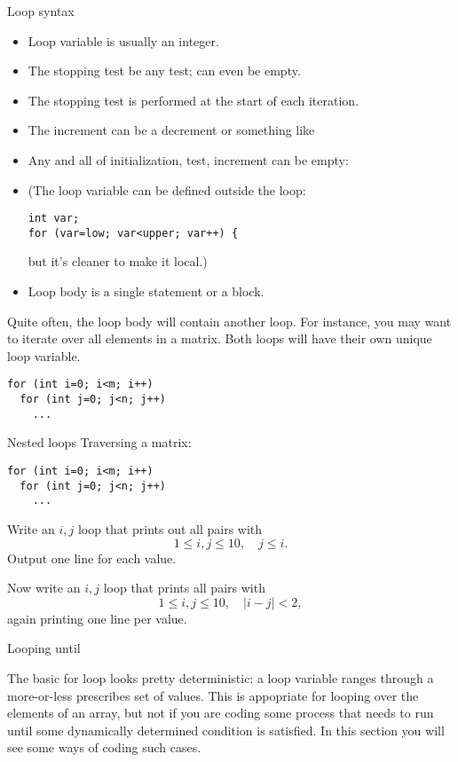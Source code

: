 \begin{slide}{Loop syntax}
  \label{sl:for-syntax}
  \begin{itemize}
  \item Loop variable is usually an integer.
  \item The stopping test be any test; can even be empty.
  \item The stopping test is performed at the start of each iteration.
  \item The increment can be a decrement or something like 
  \item Any and all of initialization, test, increment can be empty:\\
  \item (The loop variable can be defined outside the loop:
\begin{verbatim}
int var;
for (var=low; var<upper; var++) {
\end{verbatim}
but it's cleaner to make it local.)
\item Loop body is a single statement or a block.
  \end{itemize}
\end{slide}

Quite often, the loop body will contain another loop. For instance,
you may want to iterate over all elements in a matrix. Both loops will
have their own unique loop variable.
\begin{verbatim}
for (int i=0; i<m; i++)
  for (int j=0; j<n; j++)
    ...
\end{verbatim}

\begin{slide}{Nested loops}
  \label{sl:for-nest}
  Traversing a matrix:
\begin{verbatim}
for (int i=0; i<m; i++)
  for (int j=0; j<n; j++)
    ...
\end{verbatim}
\end{slide}

\begin{exercise}
  \label{ex:ij-triangle}
  Write an $i,j$ loop that prints out all pairs with
  \[ 1\leq i,j\leq 10,\quad  j\leq i. \]
  Output one line for each  value.

  Now write an $i,j$ loop that prints all pairs with
  \[ 1\leq i,j\leq 10,\quad |i-j|<2, \]
  again printing one line per  value.
\end{exercise}

 {Looping until}
\label{sec:loopuntil}

The basic for loop looks pretty deterministic: a loop variable ranges
through a more-or-less prescribes set of values. This is appopriate
for looping over the elements of an array, but not if you are coding
some process that needs to run until some dynamically determined
condition is satisfied. In this section you will see some ways of
coding such cases.


